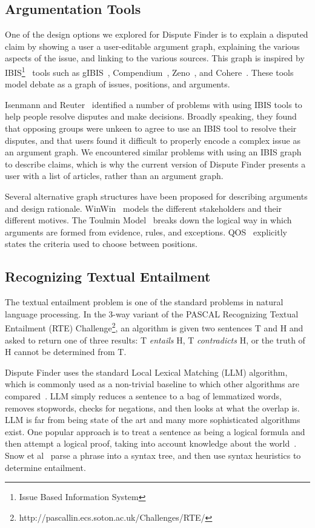 \documentclass{www2010-submission}
\begin{document}
\subsection{Argumentation Tools}

One of the design options we explored for Dispute Finder is to explain a disputed claim by showing a user a user-editable argument graph, explaining the various aspects of the issue, and linking to the various sources. This graph is inspired by IBIS\footnote{Issue Based Information System}~\cite{Rittel1973} tools such as gIBIS~\cite{Conklin1987a}, Compendium~\cite{Selvin2001}, Zeno~\cite{Gordon1997}, and Cohere~\cite{Shum2008}. These tools model debate as a graph of issues, positions, and arguments. 

Isenmann and Reuter~\cite{Isenmann1997} identified a number of problems with using IBIS tools to help people resolve disputes and make decisions. Broadly speaking, they found that opposing groups were unkeen to agree to use an IBIS tool to resolve their disputes, and that users found it difficult to properly encode a complex issue as an argument graph. We encountered similar problems with using an IBIS graph to describe claims, which is why the current version of Dispute Finder presents a user with a list of articles, rather than an argument graph.

Several alternative graph structures have been proposed for describing arguments and design rationale. WinWin~\cite{Boehm2006} models the different stakeholders and their different motives. The Toulmin Model~\cite{toulmin1958} breaks down the logical way in which arguments are formed from evidence, rules, and exceptions. QOS~\cite{Maclean1991} explicitly states the criteria used to choose between positions. 


\subsection{Recognizing Textual Entailment}

The textual entailment problem is one of the standard problems in natural language processing. In the 3-way variant of the PASCAL Recognizing Textual Entailment (RTE) Challenge\footnote{http://pascallin.ecs.soton.ac.uk/Challenges/RTE/}, an algorithm is given two sentences T and H and asked to return one of three results: T {\it entails} H, T {\it contradicts} H, or the truth of H cannot be determined from T. 

Dispute Finder uses the standard Local Lexical Matching (LLM) algorithm, which is commonly used as a non-trivial baseline to which other algorithms are compared~\cite{Braz2005}. LLM simply reduces a sentence to a bag of lemmatized words, removes stopwords, checks for negations, and then looks at what the overlap is. LLM is far from being state of the art and many more sophisticated algorithms exist. One popular approach is to treat a sentence as being a logical formula and then attempt a logical proof, taking into account knowledge about the world~\cite{Bayer2005,Bos2005}. Snow et al~\cite{Snow2006} parse a phrase into a syntax tree, and then use syntax heuristics to determine entailment.
\end{document}
